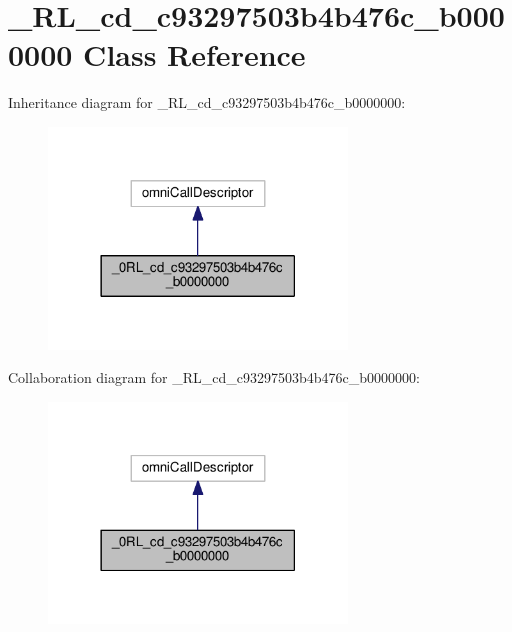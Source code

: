 \hypertarget{class__0_r_l__cd__c93297503b4b476c__b0000000}{}\section{\+\_\+R\+L\+\_\+cd\+\_\+c93297503b4b476c\+\_\+b0000000 Class Reference}
\label{class__0_r_l__cd__c93297503b4b476c__b0000000}


Inheritance diagram for \+\_\+R\+L\+\_\+cd\+\_\+c93297503b4b476c\+\_\+b0000000\+:
\nopagebreak
\begin{figure}[H]
\begin{center}
\leavevmode
\includegraphics[width=225pt]{class__0_r_l__cd__c93297503b4b476c__b0000000__inherit__graph}
\end{center}
\end{figure}


Collaboration diagram for \+\_\+R\+L\+\_\+cd\+\_\+c93297503b4b476c\+\_\+b0000000\+:
\nopagebreak
\begin{figure}[H]
\begin{center}
\leavevmode
\includegraphics[width=225pt]{class__0_r_l__cd__c93297503b4b476c__b0000000__coll__graph}
\end{center}
\end{figure}
